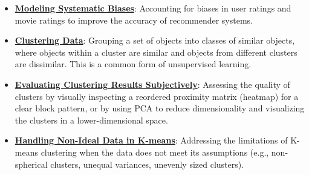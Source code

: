 \documentclass{article}%
\begin{document}
\begin{itemize}[leftmargin=*]
\item \href{https://purdue.brightspace.com/d2l/common/assets/pdfjs-d2l-dist/1.0.14-legacy/web/viewer.html?file=\%2Fcontent\%2Fenforced\%2F1095467-wl.202510.CS.24300.001\%2F11L2-svd-pca-recommender.pdf\%3Fou\%3D1095467\&lang=en-us\&container=d2l-fileviewer-rendered-pdf\&fullscreen=d2l-fileviewer-rendered-pdf-dialog\&height=667#page=40}{\textbf{Modeling Systematic Biases}}: Accounting for biases in user ratings and movie ratings to improve the accuracy of recommender systems.%
\item \href{https://purdue.brightspace.com/d2l/common/assets/pdfjs-d2l-dist/1.0.14-legacy/web/viewer.html?file=\%2Fcontent\%2Fenforced\%2F1095467-wl.202510.CS.24300.001\%2F12L2-distance-clusters.pdf\%3Fou\%3D1095467\&lang=en-us\&container=d2l-fileviewer-rendered-pdf\&fullscreen=d2l-fileviewer-rendered-pdf-dialog\&height=667#page=4}{\textbf{Clustering Data}}: Grouping a set of objects into classes of similar objects, where objects within a cluster are similar and objects from different clusters are dissimilar. This is a common form of unsupervised learning.%
\item \href{https://purdue.brightspace.com/d2l/common/assets/pdfjs-d2l-dist/1.0.14-legacy/web/viewer.html?file=\%2Fcontent\%2Fenforced\%2F1095467-wl.202510.CS.24300.001\%2F12L2-distance-clusters.pdf\%3Fou\%3D1095467\&lang=en-us\&container=d2l-fileviewer-rendered-pdf\&fullscreen=d2l-fileviewer-rendered-pdf-dialog\&height=667#page=38}{\textbf{Evaluating Clustering Results Subjectively}}: Assessing the quality of clusters by visually inspecting a reordered proximity matrix (heatmap) for a clear block pattern, or by using PCA to reduce dimensionality and visualizing the clusters in a lower-dimensional space.%
\item \href{https://purdue.brightspace.com/d2l/common/assets/pdfjs-d2l-dist/1.0.14-legacy/web/viewer.html?file=\%2Fcontent\%2Fenforced\%2F1095467-wl.202510.CS.24300.001\%2F12L2-distance-clusters.pdf\%3Fou\%3D1095467\&lang=en-us\&container=d2l-fileviewer-rendered-pdf\&fullscreen=d2l-fileviewer-rendered-pdf-dialog\&height=667#page=35}{\textbf{Handling Non-Ideal Data in K-means}}: Addressing the limitations of K-means clustering when the data does not meet its assumptions (e.g., non-spherical clusters, unequal variances, unevenly sized clusters).%
\end{itemize}

%
\end{document}
